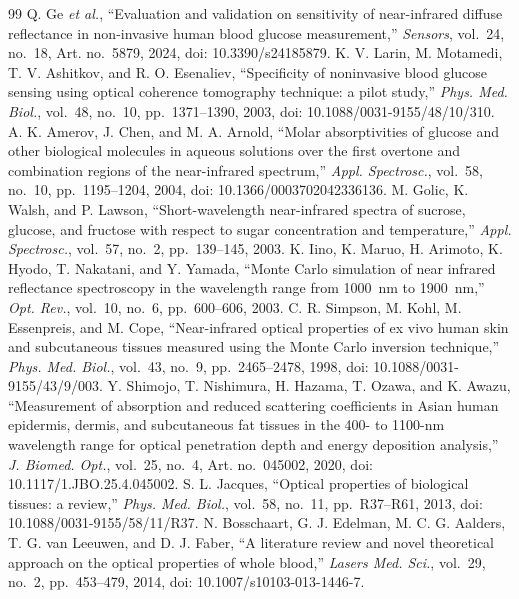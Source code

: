 \documentclass[10pt]{article}
\begin{document}
\begin{thebibliography}{99}
 Q. Ge \emph{et al.}, ``Evaluation and validation on sensitivity of near-infrared diffuse reflectance in non-invasive human blood glucose measurement,'' \emph{Sensors}, vol.~24, no.~18, Art. no.~5879, 2024, doi: 10.3390/s24185879.
 K. V. Larin, M. Motamedi, T. V. Ashitkov, and R. O. Esenaliev, ``Specificity of noninvasive blood glucose sensing using optical coherence tomography technique: a pilot study,'' \emph{Phys. Med. Biol.}, vol.~48, no.~10, pp.~1371--1390, 2003, doi: 10.1088/0031-9155/48/10/310.
 A. K. Amerov, J. Chen, and M. A. Arnold, ``Molar absorptivities of glucose and other biological molecules in aqueous solutions over the first overtone and combination regions of the near-infrared spectrum,'' \emph{Appl. Spectrosc.}, vol.~58, no.~10, pp.~1195--1204, 2004, doi: 10.1366/0003702042336136.
 M. Golic, K. Walsh, and P. Lawson, ``Short-wavelength near-infrared spectra of sucrose, glucose, and fructose with respect to sugar concentration and temperature,'' \emph{Appl. Spectrosc.}, vol.~57, no.~2, pp.~139--145, 2003.
 K. Iino, K. Maruo, H. Arimoto, K. Hyodo, T. Nakatani, and Y. Yamada, ``Monte Carlo simulation of near infrared reflectance spectroscopy in the wavelength range from 1000~nm to 1900~nm,'' \emph{Opt. Rev.}, vol.~10, no.~6, pp.~600--606, 2003.
 C. R. Simpson, M. Kohl, M. Essenpreis, and M. Cope, ``Near-infrared optical properties of ex vivo human skin and subcutaneous tissues measured using the Monte Carlo inversion technique,'' \emph{Phys. Med. Biol.}, vol.~43, no.~9, pp.~2465--2478, 1998, doi: 10.1088/0031-9155/43/9/003.
 Y. Shimojo, T. Nishimura, H. Hazama, T. Ozawa, and K. Awazu, ``Measurement of absorption and reduced scattering coefficients in Asian human epidermis, dermis, and subcutaneous fat tissues in the 400- to 1100-nm wavelength range for optical penetration depth and energy deposition analysis,'' \emph{J. Biomed. Opt.}, vol.~25, no.~4, Art. no.~045002, 2020, doi: 10.1117/1.JBO.25.4.045002.
 S. L. Jacques, ``Optical properties of biological tissues: a review,'' \emph{Phys. Med. Biol.}, vol.~58, no.~11, pp.~R37--R61, 2013, doi: 10.1088/0031-9155/58/11/R37.
 N. Bosschaart, G. J. Edelman, M. C. G. Aalders, T. G. van Leeuwen, and D. J. Faber, ``A literature review and novel theoretical approach on the optical properties of whole blood,'' \emph{Lasers Med. Sci.}, vol.~29, no.~2, pp.~453--479, 2014, doi: 10.1007/s10103-013-1446-7.

\end{thebibliography}
\end{document}
